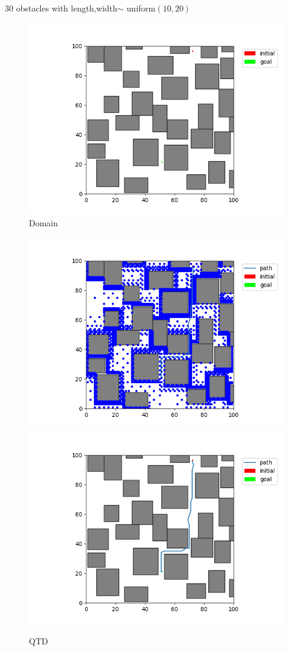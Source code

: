 \documentclass[12pt,a4paper]{article}
\begin{document}
30 obstacles with length,width$\sim$ uniform$(10,20)$\\
\begin{figure}[H]
\centering
	\includegraphics[scale=.40]{30_20_emp}
\caption{Domain}
\end{figure}

\begin{figure}[H]
\centering
	\includegraphics[scale=.40]{30_20_qtd_state}
    \includegraphics[scale=.40]{30_20_qtd_path}
\caption{QTD}
\end{figure}
\end{document}
